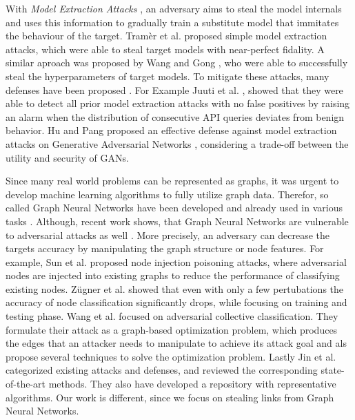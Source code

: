   With \emph{Model Extraction Attacks} \cite{atli2020extraction, juuti2019prada, tramer2016stealing}, an adversary aims to steal the model internals and uses this information to gradually train a substitute model that immitates the behaviour of the target.
  Tramèr et al. \cite{tramer2016stealing} proposed simple model extraction attacks, which were able to steal target models with near-perfect fidality.
  A similar aproach was proposed by Wang and Gong \cite{8418595}, who were able to successfully steal the hyperparameters of target models.
  To mitigate these attacks, many defenses have been proposed \cite{juuti2019prada, hu2021model, 272262, mori2021bodame}.
  For Example Juuti et al. \cite{juuti2019prada}, showed that they were able to detect all prior model extraction attacks with no false positives by raising an alarm when the distribution of consecutive API queries deviates from benign behavior.
  Hu and Pang \cite{hu2021model} proposed an effective defense against model extraction attacks on Generative Adversarial Networks \cite{goodfellow2014generative}, considering a trade-off between the utility and security of GANs.

  Since many real world problems can be represented as graphs, it was urgent to develop machine learning algorithms to fully utilize graph data.
  Therefor, so called Graph Neural Networks have been developed and already used in various tasks \cite{4700287, atwood2016diffusionconvolutional, kipf2017semisupervised, velickovic2018graph}.
  Although, recent work shows, that Graph Neural Networks are vulnerable to adversarial attacks as well \cite{agbcvmtgs, 10.1145/3366423.3380149, Z_gner_2018, Z_gner_2018, jin2020adversarial}.
  More precisely, an adversary can decrease the targets accuracy by manipulating the graph structure or node features.
  For example, Sun et al. \cite{10.1145/3366423.3380149} proposed node injection poisoning attacks, where adversarial nodes are injected into existing graphs to reduce the performance of classifying existing nodes.
  Zügner et al. \cite{Z_gner_2018} showed that even with only a few pertubations the accuracy of node classification significantly drops, while focusing on training and testing phase.
  Wang et al. \cite{agbcvmtgs} focused on adversarial collective classification.
  They formulate their attack as a graph-based optimization problem, which produces the edges that an attacker needs to manipulate to achieve its attack goal and als propose several techniques to solve the optimization problem.
  Lastly Jin et al. \cite{jin2020adversarial} categorized existing attacks and defenses, and reviewed the corresponding state-of-the-art methods. They also have developed a repository with representative algorithms.
  Our work is different, since we focus on stealing links from Graph Neural Networks.

